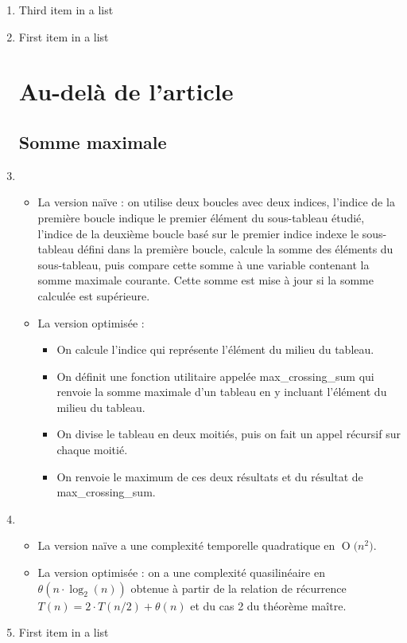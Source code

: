 \documentclass[paper=a4, fontsize=11pt]{scrartcl}
\numberwithin{equation}{section}		%
\numberwithin{figure}{section}			%
\numberwithin{table}{section}				%
\newcommand{\BigO}[1]{\ensuremath{\operatorname{O}\bigl(#1\bigr)}}
\begin{document}
\begin{enumerate}
	\item Third item in a list
    \item First item in a list

\section{Au-delà de l’article}
\subsection{Somme maximale}

	\item

\begin{itemize}
    \item La version naïve : on utilise deux boucles avec deux indices, l'indice de la première boucle
indique le premier élément du sous-tableau étudié, l'indice de la deuxième boucle basé sur le premier
indice indexe le sous-tableau défini dans la première boucle, calcule la somme des éléments du sous-tableau,
puis compare cette somme à une variable contenant la somme maximale courante. Cette somme est mise à jour
si la somme calculée est supérieure.
    \item La version optimisée : 
\begin{itemize}[label=$\bullet$]
\item On calcule l'indice qui représente l'élément du milieu du tableau.
\item On définit une fonction utilitaire appelée max\_crossing\_sum qui renvoie la somme maximale d'un tableau en y incluant l'élément
du milieu du tableau.
\item On divise le tableau en deux moitiés, puis on fait un appel récursif sur chaque moitié.
\item On renvoie le maximum de ces deux résultats et du résultat de max\_crossing\_sum.
\end{itemize}
\end{itemize}

   	\item
\begin{itemize}
\item La version naïve a une complexité temporelle quadratique en \BigO{n^2}.
\item La version optimisée : on a une complexité quasilinéaire en $\theta ( n \cdot \log _2 \left( n \right ) )$ obtenue
à partir de la relation de récurrence $ T(n) = 2 \cdot T(n/2) + \theta (n)$ et du cas 2 du théorème maître.
\end{itemize}

   	\item First item in a list

\end{enumerate}
\end{document}
